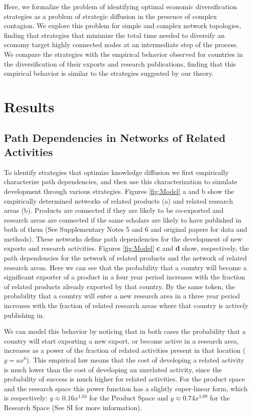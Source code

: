 \documentclass[preprint,superscriptaddress,floatfix]{article}
\begin{document}
Here, we formalize the problem of identifying optimal economic diversification strategies as a problem of strategic diffusion in the presence of complex contagion. We explore this problem for simple and complex network topologies, finding that strategies that minimize the total time needed to diversify an economy target highly connected nodes at an intermediate step of the process. We compare the strategies with the empirical behavior observed for countries in the diversification of their exports and research publications, finding that this empirical behavior is similar to the strategies suggested by our theory.

\section*{Results}
\subsection*{Path Dependencies in Networks of Related Activities}

To identify strategies that optimize knowledge diffusion we first empirically characterize path dependencies, and then use this characterization to simulate development through various strategies. Figures \ref{fig:Model} a and b show the empirically determined networks of related products (a) and related research areas (b). Products are connected if they are likely to be co-exported\cite{hidalgo2007product} and research areas are connected if the same scholars are likely to have published in both of them \cite{guevara2016research}  (See Supplementary Notes 5 and 6 and original papers for data and methods). These networks define path dependencies for the development of new exports and research activities. Figures \ref{fig:Model} \textbf{c} and \textbf{d} show, respectively, the path dependencies for the network of related products and the network of related research areas. Here we can see that the probability that a country will become a significant exporter of a product in a four year period increases with the fraction of related products already exported by that country. By the same token, the probability that a country will enter a new research area in a three year period increases with the fraction of related research areas where that country is actively publishing in.

We can model this behavior by noticing that in both cases the probability that a country will start exporting a new export, or become active in a research area, increases as a power of the fraction of related activities present in that location ($y=ax^b$). This empirical law means that the cost of developing a related activity is much lower than the cost of developing an unrelated activity, since the probability of success is much higher for related activities. For the product space and the research space this power function has a slightly super-linear form, which is respectively: $y \approx 0.16x^{1.03}$ for the Product Space and $y \approx 0.74x^{1.09}$ for the Research Space (See SI for more information).
\end{document}
